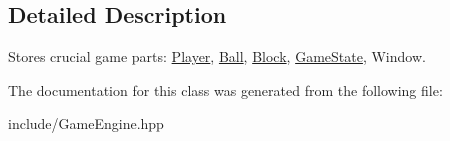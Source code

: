 \subsection{Detailed Description}
Stores crucial game parts\+: \mbox{\hyperlink{class_player}{Player}}, \mbox{\hyperlink{class_ball}{Ball}}, \mbox{\hyperlink{class_block}{Block}}, \mbox{\hyperlink{class_game_state}{Game\+State}}, Window. 

The documentation for this class was generated from the following file\+:\begin{DoxyCompactItemize}
\item 
include/Game\+Engine.\+hpp\end{DoxyCompactItemize}
